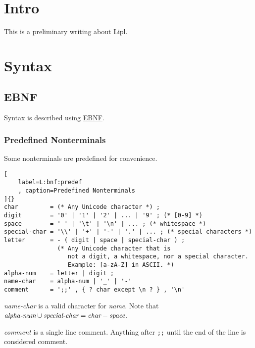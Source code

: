 \documentclass[12pt,letterpaper,notitlepage]{article}
\author{Samuel Lee}
\title{\lipl}
\newcommand{\lipl}{Lipl}
\begin{document}
\maketitle

\section{Intro}

This is a preliminary writing about \lipl.

\section{Syntax}

\subsection{EBNF}
\label{S:ebnf}

Syntax is described using
\href{http://en.wikipedia.org/wiki/Extended_Backus%E2%80%93Naur_form}{EBNF}.

\subsubsection{Predefined Nonterminals}

Some nonterminals are predefined for convenience.

\begin{lstlisting}[
    label=L:bnf:predef
    , caption=Predefined Nonterminals
]{}
char         = (* Any Unicode character *) ;
digit        = '0' | '1' | '2' | ... | '9' ; (* [0-9] *)
space        = ' ' | '\t' | '\n' | ... ; (* whitespace *)
special-char = '\\' | '+' | '-' | '.' | ... ; (* special characters *)
letter       = - ( digit | space | special-char ) ;
               (* Any Unicode character that is
                  not a digit, a whitespace, nor a special character.
                  Example: [a-zA-Z] in ASCII. *)
alpha-num    = letter | digit ;
name-char    = alpha-num | '_' | '-'
comment      = ';;' , { ? char except \n ? } , '\n'
\end{lstlisting}

\emph{name-char} is a valid character for \emph{name}.
Note that
$\emph{alpha-num} \cup \emph{special-char} = \emph{char} - \emph{space}$.

\emph{comment} is a single line comment. Anything after \verb!;;! until
the end of the line is considered comment.
\end{document}

